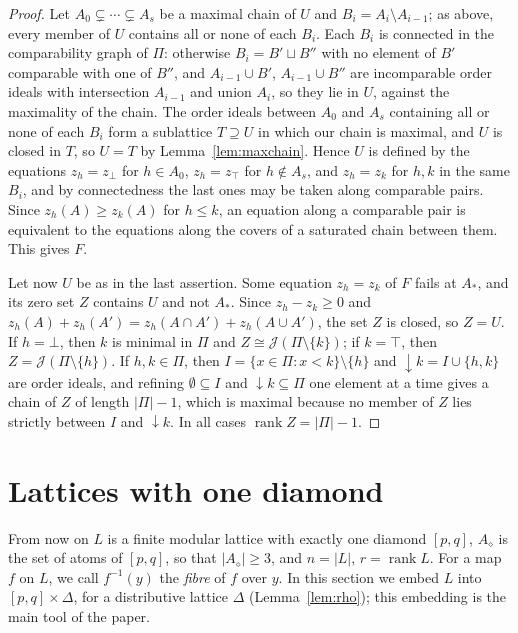 \documentclass{amsart}
\theoremstyle{definition}
\DeclareMathOperator{\rk}{rank}
\newcommand{\dm}{\diamond}
\begin{document}
\begin{proof}
Let $A_0\subsetneq\cdots\subsetneq A_s$ be a maximal chain of $U$ and $B_i=A_i\setminus A_{i-1}$; as above, every member of $U$ contains all or none of each $B_i$. Each $B_i$ is connected in the comparability graph of $\Pi$: otherwise $B_i=B'\sqcup B''$ with no element of $B'$ comparable with one of $B''$, and $A_{i-1}\cup B'$, $A_{i-1}\cup B''$ are incomparable order ideals with intersection $A_{i-1}$ and union $A_i$, so they lie in $U$, against the maximality of the chain. The order ideals between $A_0$ and $A_s$ containing all or none of each $B_i$ form a sublattice $T\supseteq U$ in which our chain is maximal, and $U$ is closed in $T$, so $U=T$ by Lemma~\ref{lem:maxchain}. Hence $U$ is defined by the equations $z_h=z_\bot$ for $h\in A_0$, $z_h=z_\top$ for $h\notin A_s$, and $z_h=z_k$ for $h,k$ in the same $B_i$, and by connectedness the last ones may be taken along comparable pairs. Since $z_h(A)\ge z_k(A)$ for $h\le k$, an equation along a comparable pair is equivalent to the equations along the covers of a saturated chain between them. This gives $F$.

Let now $U$ be as in the last assertion. Some equation $z_h=z_k$ of $F$ fails at $A_*$, and its zero set $Z$ contains $U$ and not $A_*$. Since $z_h-z_k\ge0$ and $z_h(A)+z_h(A')=z_h(A\cap A')+z_h(A\cup A')$, the set $Z$ is closed, so $Z=U$. If $h=\bot$, then $k$ is minimal in $\Pi$ and $Z\cong\mathcal J(\Pi\setminus\{k\})$; if $k=\top$, then $Z=\mathcal J(\Pi\setminus\{h\})$. If $h,k\in\Pi$, then $I=\{x\in\Pi:x<k\}\setminus\{h\}$ and ${\downarrow}k=I\cup\{h,k\}$ are order ideals, and refining $\emptyset\subseteq I$ and ${\downarrow}k\subseteq\Pi$ one element at a time gives a chain of $Z$ of length $|\Pi|-1$, which is maximal because no member of $Z$ lies strictly between $I$ and ${\downarrow}k$. In all cases $\rk Z=|\Pi|-1$.
\end{proof}

\section{Lattices with one diamond}\label{sec:structure}

From now on $L$ is a finite modular lattice with exactly one diamond $[p,q]$, $A_\dm$ is the set of atoms of $[p,q]$, so that $|A_\dm|\ge3$, and $n=|L|$, $r=\rk L$. For a map $f$ on $L$, we call $f^{-1}(y)$ the \emph{fibre} of $f$ over $y$. In this section we embed $L$ into $[p,q]\times\Delta$, for a distributive lattice $\Delta$ (Lemma~\ref{lem:rho}); this embedding is the main tool of the paper.
\end{document}
